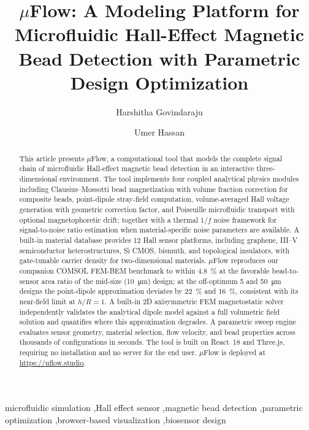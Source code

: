\documentclass[preprint,review,12pt]{elsarticle}
\begin{document}
\begin{frontmatter}

\title{$\mu$Flow: A Modeling Platform for Microfluidic Hall-Effect Magnetic Bead Detection with Parametric Design Optimization}

\author[rutgers]{Harshitha Govindaraju}
\author[rutgers]{Umer Hassan}

\begin{abstract}
This article presents $\mu$Flow, a computational tool that models the complete signal chain of microfluidic Hall-effect magnetic bead detection in an interactive three-dimensional environment. The tool implements four coupled analytical physics modules including Clausius--Mossotti bead magnetization with volume fraction correction for composite beads, point-dipole stray-field computation, volume-averaged Hall voltage generation with geometric correction factor, and Poiseuille microfluidic transport with optional magnetophoretic drift; together with a thermal $1/f$ noise framework for signal-to-noise ratio estimation when material-specific noise parameters are available. A built-in material database provides 12 Hall sensor platforms, including graphene, III--V semiconductor heterostructures, Si CMOS, bismuth, and topological insulators, with gate-tunable carrier density for two-dimensional materials. $\mu$Flow reproduces our companion COMSOL FEM-BEM benchmark to within \SI{4.8}{\percent} at the favorable bead-to-sensor area ratio of the mid-size (\SI{10}{\micro\meter}) design; at the off-optimum \SI{5}{} and \SI{50}{\micro\meter} designs the point-dipole approximation deviates by \SI{22}{\percent} and \SI{16}{\percent}, consistent with its near-field limit at $h/R = 1$. A built-in 2D axisymmetric FEM magnetostatic solver independently validates the analytical dipole model against a full volumetric field solution and quantifies where this approximation degrades. A parametric sweep engine evaluates sensor geometry, material selection, flow velocity, and bead properties across thousands of configurations in seconds. The tool is built on React~18 and Three.js, requiring no installation and no server for the end user. $\mu$Flow is deployed at \url{https://uflow.studio}.
\end{abstract}


\begin{keyword}
microfluidic simulation \sep Hall effect sensor \sep magnetic bead detection \sep parametric optimization \sep browser-based visualization \sep biosensor design
\end{keyword}

\end{frontmatter}
\end{document}
